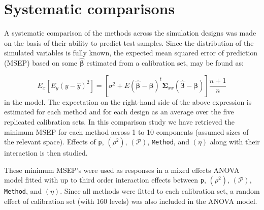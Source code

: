 \documentclass[a4paper, 11pt]{article}
\begin{document}
\section{Systematic comparisons}
A systematic comparison of the methods across the simulation designs was made on the basis of their ability to predict test samples. Since the distribution of the simulated variables is fully known, the expected mean squared error of prediction (MSEP) based on some $\hat{\bm{\beta}}$ estimated from a calibration set, may be found as:

\begin{equation*}
    E_x\left[E_y\left(y - \hat{y}\right)^2\right] =
    \left[\sigma^2 + E\left(\hat{\bm{\beta}} - \bm{\beta}\right)^t\bm{\Sigma}_{xx}\left(\hat{\bm{\beta}} - \bm{\beta}\right)\right]\frac{n+1}{n}
\end{equation*}
in the model. The expectation on the right-hand side of the above expression is estimated for each method and for each design as an average over the five replicated calibration sets. In this comparison study we have retrieved the minimum MSEP for each method across 1 to 10 components (assumed sizes of the relevant space). Effects of {\tt p}, $(\rho^2)$, $(\mathcal{P})$, {\tt Method}, and $(\eta)$ along with their interaction is then studied.

These minimum MSEP's were used as responses in a mixed effects ANOVA model fitted with up to third order interaction effects between {\tt p}, $(\rho^2)$, $(\mathcal{P})$, {\tt Method}, and $(\eta)$. Since all methods were fitted to each calibration set, a random effect of calibration set (with 160 levels) was also included in the ANOVA model.



\end{document}
